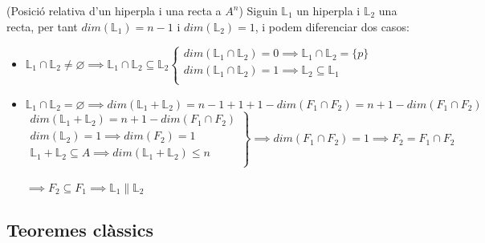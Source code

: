\begin{exmp}(Posició relativa d'un hiperpla i una recta a $A^n$)
	Siguin $\mathbb{L}_1$ un hiperpla i $\mathbb{L}_2$ una recta, per tant $dim(\mathbb{L}_1)=n-1$ i $dim(\mathbb{L}_2)=1$, i podem diferenciar dos casos:
	\begin{itemize}
		\item $\mathbb{L}_1\cap\mathbb{L}_2\neq\varnothing\implies\mathbb{L}_1\cap\mathbb{L}_2\subseteq\mathbb{L}_2\left\{\begin{array}{l}
			dim(\mathbb{L}_1\cap\mathbb{L}_2)=0\implies\mathbb{L}_1\cap\mathbb{L}_2=\{p\} \\
			dim(\mathbb{L}_1\cap\mathbb{L}_2)=1\implies\mathbb{L}_2\subseteq\mathbb{L}_1  \\
		\end{array}\right.$
		\item $\mathbb{L}_1\cap\mathbb{L}_2=\varnothing\implies dim(\mathbb{L}_1+\mathbb{L}_2)=n-1+1+1-dim(F_1\cap F_2)=n+1-dim(F_1\cap F_2)$ \\
		\[\left.\begin{array}{r}
			dim(\mathbb{L}_1+\mathbb{L}_2)=n+1-dim(F_1\cap F_2) \\
			dim(\mathbb{L}_2)=1\implies dim(F_2)=1 \\
			\mathbb{L}_1+\mathbb{L}_2\subseteq A\implies dim(\mathbb{L}_1+\mathbb{L}_2)\leq n \\
		\end{array}\right\}\implies dim(F_1\cap F_2)=1\implies F_2=F_1\cap F_2\] \\
		$\implies F_2\subseteq F_1\implies \mathbb{L}_1\parallel\mathbb{L}_2$
	\end{itemize}
\end{exmp}

\subsection{Teoremes clàssics}
\label{ss_teocla}


